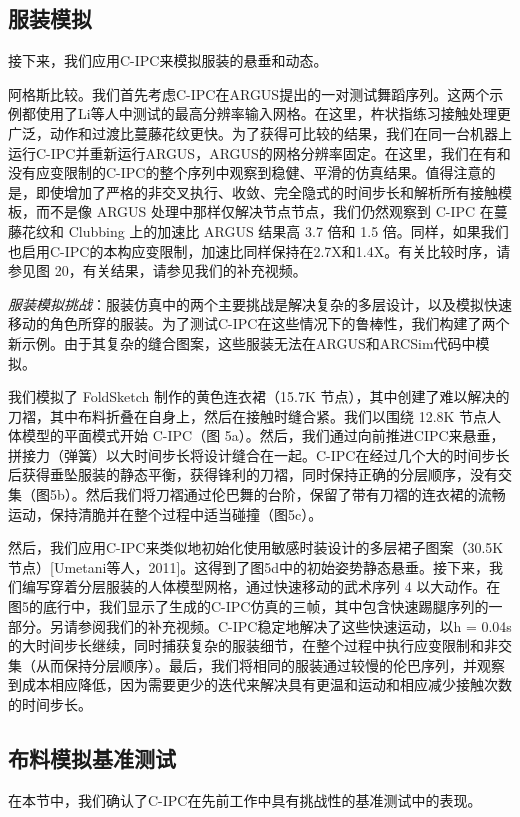 \subsection{服装模拟}

接下来，我们应用C-IPC来模拟服装的悬垂和动态。

阿格斯比较。我们首先考虑C-IPC在ARGUS提出的一对测试舞蹈序列。这两个示例都使用了Li等人中测试的最高分辨率输入网格。在这里，杵状指练习接触处理更广泛，动作和过渡比蔓藤花纹更快。为了获得可比较的结果，我们在同一台机器上运行C-IPC并重新运行ARGUS，ARGUS的网格分辨率固定。在这里，我们在有和没有应变限制的C-IPC的整个序列中观察到稳健、平滑的仿真结果。值得注意的是，即使增加了严格的非交叉执行、收敛、完全隐式的时间步长和解析所有接触模板，而不是像 ARGUS 处理中那样仅解决节点节点，我们仍然观察到 C-IPC 在蔓藤花纹和 Clubbing 上的加速比 ARGUS 结果高 3.7 倍和 1.5 倍。同样，如果我们也启用C-IPC的本构应变限制，加速比同样保持在2.7X和1.4X。有关比较时序，请参见图 20，有关结果，请参见我们的补充视频。

\textit{服装模拟挑战}：服装仿真中的两个主要挑战是解决复杂的多层设计，以及模拟快速移动的角色所穿的服装。为了测试C-IPC在这些情况下的鲁棒性，我们构建了两个新示例。由于其复杂的缝合图案，这些服装无法在ARGUS和ARCSim代码中模拟。

我们模拟了 FoldSketch 制作的黄色连衣裙（15.7K 节点），其中创建了难以解决的刀褶，其中布料折叠在自身上，然后在接触时缝合紧。我们以围绕 12.8K 节点人体模型的平面模式开始 C-IPC（图 5a）。然后，我们通过向前推进CIPC来悬垂，拼接力（弹簧）以大时间步长将设计缝合在一起。C-IPC在经过几个大的时间步长后获得垂坠服装的静态平衡，获得锋利的刀褶，同时保持正确的分层顺序，没有交集（图5b）。然后我们将刀褶通过伦巴舞的台阶，保留了带有刀褶的连衣裙的流畅运动，保持清脆并在整个过程中适当碰撞（图5c）。

然后，我们应用C-IPC来类似地初始化使用敏感时装设计的多层裙子图案（30.5K节点）[Umetani等人，2011]。这得到了图5d中的初始姿势静态悬垂。接下来，我们编写穿着分层服装的人体模型网格，通过快速移动的武术序列 4 以大动作。在图5的底行中，我们显示了生成的C-IPC仿真的三帧，其中包含快速踢腿序列的一部分。另请参阅我们的补充视频。C-IPC稳定地解决了这些快速运动，以h = 0.04s的大时间步长继续，同时捕获复杂的服装细节，在整个过程中执行应变限制和非交集（从而保持分层顺序）。最后，我们将相同的服装通过较慢的伦巴序列，并观察到成本相应降低，因为需要更少的迭代来解决具有更温和运动和相应减少接触次数的时间步长。

\subsection{布料模拟基准测试}
在本节中，我们确认了C-IPC在先前工作中具有挑战性的基准测试中的表现。

